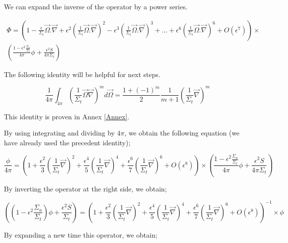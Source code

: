 \documentclass[a4paper, 12pt]{report}
\begin{document}
\begin{appendix}
We can expand the inverse of the operator by a power series.

\begin{multline}
\Phi = \left( 1 - \frac{\epsilon}{\Sigma_t} \vec{\Omega}.\vec{\nabla} + \epsilon^2 \left(\frac{1}{\Sigma_t} \vec{\Omega}.\vec{\nabla}\right)^2 - \epsilon^3 \left(\frac{1}{\Sigma_t} \vec{\Omega}.\vec{\nabla}\right)^3 +  \dots + \epsilon^6 \left(\frac{1}{\Sigma_t} \vec{\Omega}.\vec{\nabla}\right)^6  + O(\epsilon^7)\right) \times\\ \left(\frac{1-\epsilon^2\frac{\Sigma_a}{\Sigma_t}}{4\pi}\phi + \frac{\epsilon^2S}{4\pi \Sigma_t}\right)
\end{multline}

The following identity will be helpful for next steps.

\begin{equation}
\frac{1}{4\pi}\int_{4\pi} \left(\frac{1}{\Sigma_t}\vec{\Omega}\vec{\nabla}\right)^m d\vec{\Omega} = \frac{1+(-1)^m}{2}\frac{1}{m+1} \left(\frac{1}{\Sigma_t}\vec{\nabla}\right)^m
\end{equation}

This identity is proven in Annex \ref{Annex}.

By using integrating and dividing by $4\pi$, we obtain the following equation (we have already used the precedent identity);

\begin{equation}
\frac{\phi}{4\pi} = \left( 1  + \frac{\epsilon^2}{3} \left(\frac{1}{\Sigma_t} \vec{\nabla}\right)^2 + \frac{\epsilon^4}{5} \left(\frac{1}{\Sigma_t} \vec{\nabla}\right)^4 + \frac{\epsilon^6}{7} \left(\frac{1}{\Sigma_t} \vec{\nabla}\right)^6  + O(\epsilon^8)\right) \times \left(\frac{1-\epsilon^2\frac{\Sigma_a}{\Sigma_t}}{4\pi}\phi + \frac{\epsilon^2S}{4\pi \Sigma_t}\right)
\end{equation}

By inverting the operator at the right side, we obtain;

\begin{equation}
\left(\left(1-\epsilon^2\frac{\Sigma_a}{\Sigma_t}\right)\phi + \frac{\epsilon^2S}{ \Sigma_t}\right)= \left( 1  + \frac{\epsilon^2}{3} \left(\frac{1}{\Sigma_t} \vec{\nabla}\right)^2 + \frac{\epsilon^4}{5} \left(\frac{1}{\Sigma_t} \vec{\nabla}\right)^4 + \frac{\epsilon^6}{7} \left(\frac{1}{\Sigma_t} \vec{\nabla}\right)^6  + O(\epsilon^8)\right)^{-1} \times \phi
\end{equation}

By expanding a new time this operator, we obtain;


\end{appendix}
\end{document}
